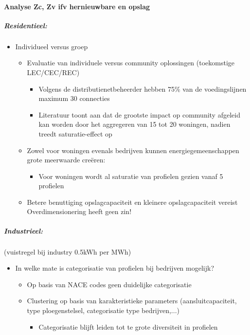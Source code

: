 \documentclass[12pt]{article}
\begin{document}
\paragraph{Analyse Zc, Zv ifv hernieuwbare en opslag}
\subparagraph{Residentieel:}
\begin{itemize}
    \item Individueel versus groep\begin{itemize}
        \item Evaluatie van individuele versus community oplossingen (toekomstige LEC/CEC/REC)\begin{itemize}
            \item Volgens de distributienetbeheerder hebben 75\% van de voedingslijnen maximum 30 connecties
            \item Literatuur toont aan dat de grootste impact op community afgeleid kan worden door het aggregeren van 15 tot 20 woningen, nadien treedt saturatie-effect op
        \end{itemize}
        \item Zowel voor woningen evenals bedrijven kunnen energiegemeenschappen
        grote meerwaarde creëren:\begin{itemize}
            \item Voor woningen wordt al saturatie van profielen gezien vanaf 5 profielen
        \end{itemize}
        \item Betere benuttiging opslagcapaciteit en kleinere opslagcapaciteit vereist Overdimensionering heeft geen zin!
    \end{itemize}
\end{itemize}
\subparagraph{Industrieel:}
(vuistregel bij industry 0.5kWh per MWh)
\begin{itemize}
    \item In welke mate is categorisatie van profielen bij bedrijven mogelijk?\begin{itemize}
        \item Op basis van NACE codes geen duidelijke categorisatie
        \item Clustering op basis van karakteristieke parameters (aansluitcapaciteit, type ploegenstelsel, categorisatie type bedrijven,...)
        \begin{itemize}
            \item Categorisatie blijft leiden tot te grote diversiteit in profielen
        \end{itemize}
    \end{itemize}
\end{itemize}
\end{document}
